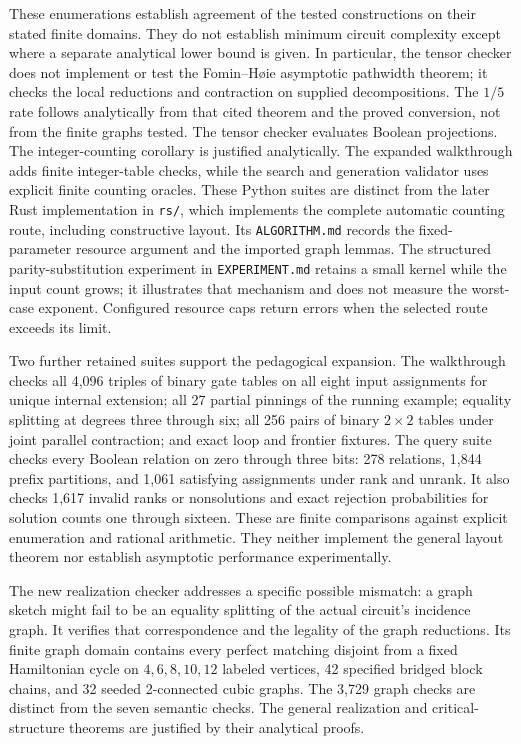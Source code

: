 These enumerations establish agreement of the tested constructions on
their stated finite domains. They do not establish minimum circuit
complexity except where a separate analytical lower bound is given.
In particular, the tensor checker does not implement or test the
Fomin--H\o ie asymptotic pathwidth theorem; it checks the local
reductions and contraction on supplied decompositions. The $1/5$
rate follows analytically from that cited theorem and the proved
conversion, not from the finite graphs tested.
The tensor checker evaluates Boolean projections. The integer-counting
corollary is justified analytically. The expanded walkthrough adds finite
integer-table checks, while the search and generation validator uses explicit
finite counting oracles. These Python suites are distinct from the later
Rust implementation in \texttt{rs/}, which implements the complete
automatic counting route, including constructive layout. Its
\texttt{ALGORITHM.md} records the fixed-parameter resource argument
and the imported graph lemmas. The structured parity-substitution
experiment in \texttt{EXPERIMENT.md} retains a small kernel while the
input count grows; it illustrates that mechanism and does not measure
the worst-case exponent. Configured resource caps return errors when
the selected route exceeds its limit.

Two further retained suites support the pedagogical expansion. The walkthrough
checks all 4,096 triples of binary gate tables on all eight input assignments
for unique internal extension; all 27 partial pinnings of the running example;
equality splitting at degrees three through six; all 256 pairs of binary
$2\times2$ tables under joint parallel contraction; and exact loop and
frontier fixtures. The query suite checks every Boolean relation on zero
through three bits: 278 relations, 1,844 prefix partitions, and 1,061
satisfying assignments under rank and unrank. It also checks 1,617 invalid
ranks or nonsolutions and exact rejection probabilities for solution counts
one through sixteen. These are finite comparisons against explicit
enumeration and rational arithmetic. They neither implement the general
layout theorem nor establish asymptotic performance experimentally.

The new realization checker addresses a specific possible mismatch:
a graph sketch might fail to be an equality splitting of the actual
circuit's incidence graph. It verifies that correspondence and the
legality of the graph reductions. Its finite graph domain contains
every perfect matching disjoint from a fixed Hamiltonian cycle on
$4,6,8,10,12$ labeled vertices, 42 specified bridged block chains,
and 32 seeded 2-connected cubic graphs. The 3,729 graph checks are
distinct from the seven semantic checks. The general realization and
critical-structure theorems are justified by their analytical proofs.

